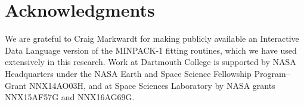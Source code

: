   
  \section*{Acknowledgments}

  We are grateful to Craig Markwardt for making publicly available an
  Interactive Data Language version of the MINPACK-1 fitting routines, which we
  have used extensively in this research. Work at Dartmouth College is supported
  by NASA Headquarters under the NASA Earth and Space Science Fellowship
  Program--Grant NNX14AO03H, and at Space Sciences Laboratory by NASA grants
  NNX15AF57G and NNX16AG69G.



